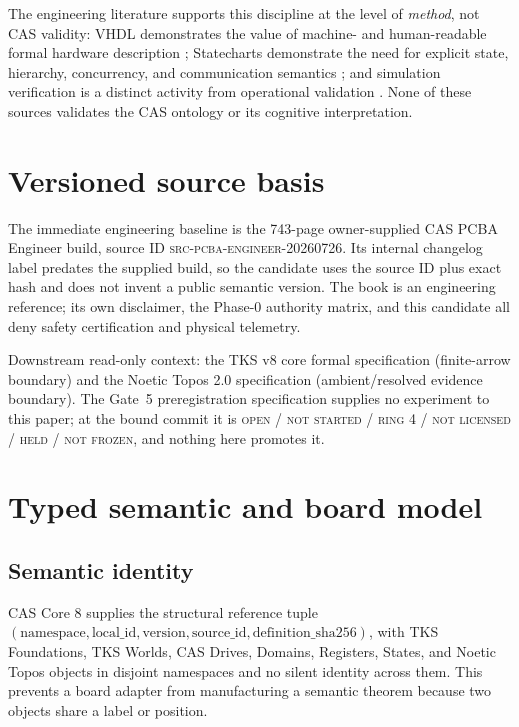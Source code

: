 \documentclass[11pt]{amsart}
\theoremstyle{definition}
\theoremstyle{remark}
\begin{document}
The engineering literature supports this discipline at the level of \emph{method}, not CAS validity: VHDL demonstrates the value of machine- and human-readable formal hardware description \cite{vhdl}; Statecharts demonstrate the need for explicit state, hierarchy, concurrency, and communication semantics \cite{harel}; and simulation verification is a distinct activity from operational validation \cite{sargent}. None of these sources validates the CAS ontology or its cognitive interpretation.

\section{Versioned source basis}\label{sec:sources}

The immediate engineering baseline is the 743-page owner-supplied CAS PCBA Engineer build, source ID \textsc{src-pcba-engineer-20260726}. Its internal changelog label predates the supplied build, so the candidate uses the source ID plus exact hash and does not invent a public semantic version. The book is an engineering reference; its own disclaimer, the Phase-0 authority matrix, and this candidate all deny safety certification and physical telemetry.

Downstream read-only context: the TKS v8 core formal specification (finite-arrow boundary) and the Noetic Topos 2.0 specification (ambient/resolved evidence boundary). The Gate~5 preregistration specification supplies no experiment to this paper; at the bound commit it is \textsc{open / not started / ring 4 / not licensed / held / not frozen}, and nothing here promotes it.

\section{Typed semantic and board model}\label{sec:types}

\subsection{Semantic identity}
CAS Core 8 supplies the structural reference tuple $(\text{namespace},\text{local\_id},\text{version},\text{source\_id},\text{definition\_sha256})$, with TKS Foundations, TKS Worlds, CAS Drives, Domains, Registers, States, and Noetic Topos objects in disjoint namespaces and no silent identity across them. This prevents a board adapter from manufacturing a semantic theorem because two objects share a label or position.
\end{document}
